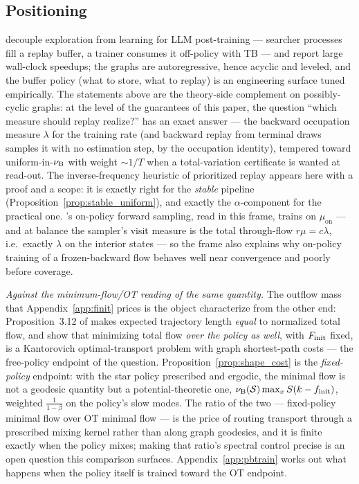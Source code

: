 \subsection{Positioning}\label{sec:positioning}

\citet{bartoldson2025trajectory} decouple exploration from learning for LLM post-training
--- searcher processes fill a replay buffer, a trainer consumes it off-policy with TB ---
and report large wall-clock speedups; the graphs are autoregressive, hence acyclic and
leveled, and the buffer policy (what to store, what to replay) is an engineering
surface tuned empirically. The statements above are the theory-side complement on
possibly-cyclic graphs: at the level of the guarantees of this paper, the question
``which measure should replay realize?'' has an exact answer --- the backward occupation
measure $\lambda$ for the training rate (and backward replay from terminal draws samples
it with no estimation step, by the occupation identity), tempered toward
uniform-in-$\nu_{\mathrm{B}}$ with weight $\sim1/T$ when a total-variation certificate is wanted
at read-out. The inverse-frequency heuristic of prioritized replay appears here with a
proof and a scope: it is exactly right for the \emph{stable} pipeline
(Proposition~\ref{prop:stable_uniform}), and exactly the $\alpha$-component for the
practical one. \citet{morozov2025revisiting}'s on-policy forward sampling, read in this
frame, trains on $\mu_{\mathrm{on}}$ --- and at balance the sampler's visit measure is
the total through-flow $r\mu=c\lambda$, i.e.\ exactly $\lambda$ on the interior states
--- so the frame also explains why on-policy training of a frozen-backward flow behaves
well near convergence and poorly before coverage.

\emph{Against the minimum-flow/OT reading of the same quantity.} The outflow mass that
Appendix~\ref{app:finit} prices is the object \citet{maksimov2026ot} characterize
from the other end: Proposition~3.12 of \citet{morozov2025revisiting} makes
expected trajectory length \emph{equal} to normalized total flow, and
\citet{maksimov2026ot} show that minimizing total flow \emph{over the policy as well},
with $F_{\mathrm{init}}$ fixed, is a Kantorovich optimal-transport problem with graph shortest-path
costs --- the free-policy endpoint of the question. Proposition~\ref{prop:shape_cost} is
the \emph{fixed-policy} endpoint: with the star policy prescribed and ergodic, the
minimal flow is not a geodesic quantity but a potential-theoretic one,
$\nu_{\mathrm{B}}(\mathcal S)\max_xS(k-f_{\mathrm{init}})$, weighted $\frac1{1-\beta}$ on the policy's slow
modes. The ratio of the two --- fixed-policy minimal flow over OT minimal flow --- is
the price of routing transport through a prescribed mixing kernel rather than along
graph geodesics, and it is finite exactly when the policy mixes; making that ratio's
spectral control precise is an open question this comparison surfaces.
Appendix~\ref{app:pbtrain} works out what happens when the policy itself is trained
toward the OT endpoint.

